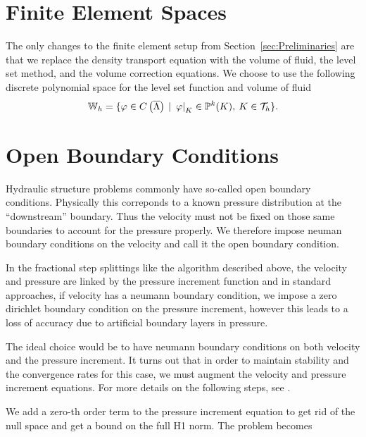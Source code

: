 \documentclass[letterpaper]{erdc}
\begin{document}
\section{Finite Element Spaces}\label{sec:2PPreliminaries}
The only changes to the finite element setup from Section~\ref{sec:Preliminaries} are that we replace 
the density transport equation with the volume of fluid, the level set method, and the volume correction 
equations.  We choose to use the following discrete polynomial space for the level set function and volume of fluid
\begin{equation*}
\mathbb{W}_h = \{ \varphi \in C\left(\overline{\Lambda}\right) \:|\: \left.\varphi\right|_{K} \in \mathbb{P}^{k}(K),\: K\in\mathcal{T}_h \}.
\end{equation*}








%
%
%
\section{Open Boundary Conditions}\label{sec:OpenBoundaryConditions}

Hydraulic structure problems commonly have so-called open boundary
conditions. Physically this correponds to a known pressure
distribution at the ``downstream'' boundary.  Thus the velocity must not be 
fixed on those same boundaries to account for the pressure properly.  We 
therefore impose neuman boundary conditions on the velocity and call 
it the open boundary condition.

In the fractional step splittings like the algorithm described above, the
velocity and pressure are linked by the pressure increment function and 
in standard approaches, if velocity has a neumann boundary condition, we 
impose a zero dirichlet boundary condition on the pressure increment, however
this leads to a loss of accuracy due to artificial boundary layers in pressure.

The ideal choice would be to have neumann boundary conditions on both velocity
and the pressure increment.  It turns out that in order to maintain stability
and the convergence rates for this case, we must augment the velocity and 
pressure increment equations.  For more details on the following steps, see \cite{bonito2015modified}.

We add a zero-th order term to the pressure increment equation 
to get rid of the null space and get a bound on the full H1 norm.  The problem becomes
\end{document}
